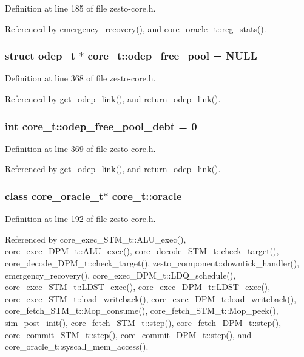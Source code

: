 Definition at line 185 of file zesto-core.h.

Referenced by emergency\_\-recovery(), and core\_\-oracle\_\-t::reg\_\-stats().
\subsubsection[{odep\_\-free\_\-pool}]{\setlength{\rightskip}{0pt plus 5cm}struct {\bf odep\_\-t} $\ast$ {\bf core\_\-t::odep\_\-free\_\-pool} = NULL\hspace{0.3cm}{\tt  [static, read, protected]}}\label{classcore__t_3661ae39476a6b7fd401555ed7cdca6a}




Definition at line 368 of file zesto-core.h.

Referenced by get\_\-odep\_\-link(), and return\_\-odep\_\-link().
\subsubsection[{odep\_\-free\_\-pool\_\-debt}]{\setlength{\rightskip}{0pt plus 5cm}int {\bf core\_\-t::odep\_\-free\_\-pool\_\-debt} = 0\hspace{0.3cm}{\tt  [static, protected]}}\label{classcore__t_481bb5edace5509f6a976456c1e6b277}




Definition at line 369 of file zesto-core.h.

Referenced by get\_\-odep\_\-link(), and return\_\-odep\_\-link().
\subsubsection[{oracle}]{\setlength{\rightskip}{0pt plus 5cm}class {\bf core\_\-oracle\_\-t}$\ast$ {\bf core\_\-t::oracle}}\label{classcore__t_e4ae7e910eea6077916a780537d3210e}




Definition at line 192 of file zesto-core.h.

Referenced by core\_\-exec\_\-STM\_\-t::ALU\_\-exec(), core\_\-exec\_\-DPM\_\-t::ALU\_\-exec(), core\_\-decode\_\-STM\_\-t::check\_\-target(), core\_\-decode\_\-DPM\_\-t::check\_\-target(), zesto\_\-component::downtick\_\-handler(), emergency\_\-recovery(), core\_\-exec\_\-DPM\_\-t::LDQ\_\-schedule(), core\_\-exec\_\-STM\_\-t::LDST\_\-exec(), core\_\-exec\_\-DPM\_\-t::LDST\_\-exec(), core\_\-exec\_\-STM\_\-t::load\_\-writeback(), core\_\-exec\_\-DPM\_\-t::load\_\-writeback(), core\_\-fetch\_\-STM\_\-t::Mop\_\-consume(), core\_\-fetch\_\-STM\_\-t::Mop\_\-peek(), sim\_\-post\_\-init(), core\_\-fetch\_\-STM\_\-t::step(), core\_\-fetch\_\-DPM\_\-t::step(), core\_\-commit\_\-STM\_\-t::step(), core\_\-commit\_\-DPM\_\-t::step(), and core\_\-oracle\_\-t::syscall\_\-mem\_\-access().

